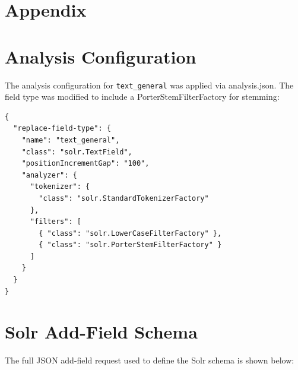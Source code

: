 \appendix
\section*{Appendix}
\section{Analysis Configuration}
\label{appendix:analysis}

The analysis configuration for \texttt{text\_general} was applied via analysis.json. The field type was modified to include a PorterStemFilterFactory for stemming:

\begin{verbatim}
{
  "replace-field-type": {
    "name": "text_general",
    "class": "solr.TextField",
    "positionIncrementGap": "100",
    "analyzer": {
      "tokenizer": {
        "class": "solr.StandardTokenizerFactory"
      },
      "filters": [
        { "class": "solr.LowerCaseFilterFactory" },
        { "class": "solr.PorterStemFilterFactory" }
      ]
    }
  }
}
\end{verbatim}

\section{Solr Add-Field Schema}
\label{appendix:addfield}

The full JSON add-field request used to define the Solr schema is shown below:

